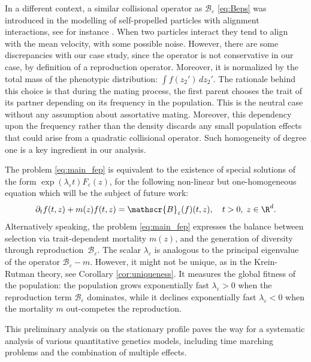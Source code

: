 \documentclass[JEP,XML,SOM,Unicode]{cedram}
\let\mathcal\mathscr
\newcommand{\cB}{\mathcal{B}}
\theoremstyle{plain}
\theoremstyle{definition}
\let\eps\varepsilon
\begin{document}
In a different context, a similar collisional operator as $\cB_\eps$ \eqref{eq:Beps} was introduced in the modelling of self-propelled particles with alignment interactions, see for instance \cite{bertin_boltzmann_2006,degond_local_2014}. When two particles interact they tend to align with the mean velocity, with some possible noise. However, there are some discrepancies with our case study, since the operator is not conservative in our case, by definition of a reproduction operator. Moreover, it is normalized by the total mass of the phenotypic distribution: $\int f(z_2')\, d z_2'$. The rationale behind this choice is that during the mating process, the first parent chooses the trait of its partner depending on its frequency in the population. This is the neutral case without any assumption about assortative mating. Moreover, this dependency upon the frequency rather than the density discards any small population effects that could arise from a quadratic collisional operator. Such homogeneity of degree
one is a key ingredient in our analysis.

The problem \eqref{eq:main_fep} is equivalent to the existence of special solutions of the form $\exp (\lambda_\eps t) F_\eps(z)$, for the following non-linear but one-homogeneous equation which will be the subject of future work:
\begin{equation}\label{eq:time marching}
\partial_t f(t,z) + m(z)f(t,z) = \cB_\eps(f)(t,z), \quad t>0,\; z\in \R^d.
\end{equation}
Alternatively speaking, the problem \eqref{eq:main_fep} expresses the balance between selection via trait-dependent mortality $m(z)$, and the generation of diversity through reproduction~$\cB_\eps$. The scalar $\lambda_\eps$ is analogous to the principal eigenvalue of the operator $\cB_\eps - m$. However, it might not be unique, as in the Krein-Rutman theory, see Corollary \ref{cor:uniqueness}. It measures the global fitness of the population: the population grows exponentially fast $\lambda_\eps>0$ when the reproduction term $\cB_\eps$ dominates, while it declines exponentially fast $\lambda_\eps<0$ when the mortality $m$ out-competes the reproduction.

This preliminary analysis on the stationary profile paves the way for a systematic analysis of various quantitative genetics models, including time marching problems and the combination of multiple effects.
\end{document}
